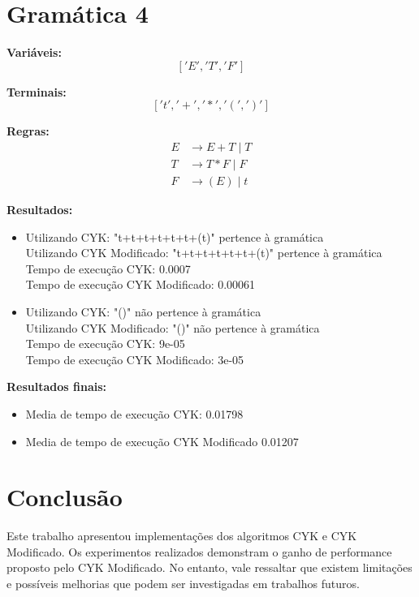 \documentclass[a4paper,12pt]{article} %
\begin{document}
\section*{Gramática 4}
\textbf{Variáveis:}
\[
['E', 'T', 'F']
\]

\textbf{Terminais:}
\[
['t', '+', '*', '(', ')']
\]

\textbf{Regras:}
\begin{align*}
E &\to E + T \mid T \\
T &\to T * F \mid F \\
F &\to ( E ) \mid t
\end{align*}

\textbf{Resultados:}
\begin{itemize}
    \item Utilizando CYK: "t+t+t+t+t+t+(t)" pertence à gramática \\
    Utilizando CYK Modificado: "t+t+t+t+t+t+(t)" pertence à gramática \\
    Tempo de execução CYK: 0.0007 \\
    Tempo de execução CYK Modificado: 0.00061 \\
    
    \item Utilizando CYK: "()" não pertence à gramática \\
    Utilizando CYK Modificado: "()" não pertence à gramática \\
    Tempo de execução CYK: 9e-05 \\
    Tempo de execução CYK Modificado: 3e-05 \\
\end{itemize}

\textbf{Resultados finais:}
\begin{itemize}
    \item Media de tempo de execução CYK: 0.01798
    \item Media de tempo de execução CYK Modificado 0.01207
\end{itemize}

\section{Conclusão}

Este trabalho apresentou implementações dos algoritmos CYK e CYK Modificado. Os experimentos realizados demonstram o ganho de performance proposto pelo CYK Modificado. No entanto, vale ressaltar que existem limitações e possíveis melhorias que podem ser investigadas em trabalhos futuros.
\end{document}
